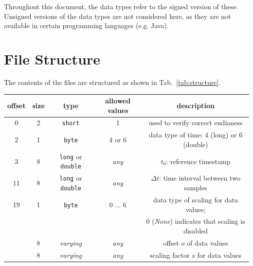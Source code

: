 \documentclass[a4paper,10pt]{article}
\begin{document}
Throughout this document, the data types refer to the signed version of these. Unsigned versions of the data types are not
considered here, as they are not available in certain programming languages (e.g. Java).

\section{File Structure}\label{sec:file_structure}
The contents of the files are structured as shown in Tab.~\ref{tab:structure}.
\begin{table}[htbp]
 \centering
 \begin{tabular}{|c|c|c|c|c|}
    \hline
    offset & size             & type                             & allowed values    & description \\
    \hline                                                                                 
    0      & 2                & \texttt{short}                   & 1                 & used to verify correct endianess  \\
    \hline                                                                                 
    2      & 1                & \texttt{byte}                    & 4 or 6            & data type of time: 4 (long) or 6 (double) \\
    \hline                                                                                 
    3      & 8                & \texttt{long} or \texttt{double} & \textit{any}      & $t_0$: reference timestamp \\
    \hline                                                                                 
    11     & 8                & \texttt{long} or \texttt{double} & \textit{any}      & $\Delta t$: time interval between two samples \\
    \hline                           
    19     & 1                & \texttt{byte}                    & 0 ... 6           & data type of scaling for data values; \\
     ~     & ~                &      ~                           &                   & 0 (\textit{None}) indicates that scaling is disabled  \\
    \hline                           
    [20]   & 8                & \textit{varying}                 & \textit{any}      & offset $o$ of data values \\
    \hline                                                                                 
    [28]   & 8                & \textit{varying}                 & \textit{any}      & scaling factor $s$ for data values \\

\end{tabular}
\end{table}
\end{document}
